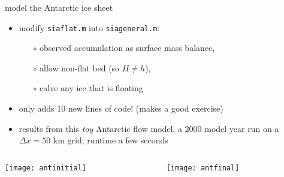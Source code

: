 \begin{frame}{model the Antarctic ice sheet}

\normalsize
\begin{itemize}
\item modify \texttt{siaflat.m} into \texttt{siageneral.m}:
  \begin{itemize}
  \item[$\circ$] observed accumulation as surface mass balance,
  \item[$\circ$] allow non-flat bed (so $H\ne h$),
  \item[$\circ$] calve any ice that is floating
  \end{itemize}
\item only adds 10 new lines of code!  \quad  (makes a good exercise)
\item results from this \emph{toy} Antarctic flow model, a 2000 model year run on a $\Delta x=50$ km grid; runtime a few seconds
\end{itemize}

\bigskip

\begin{columns}
\begin{column}{0.4\textwidth}
\texttt{[image: antinitial]}
\end{column}
\begin{column}{0.55\textwidth}
\texttt{[image: antfinal]}
\end{column}
\end{columns}
\end{frame}
